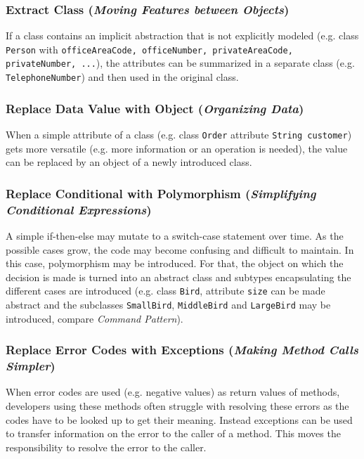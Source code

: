\subsubsection*{Extract Class (\textit{Moving Features between Objects})}
If a class contains an implicit abstraction that is not explicitly modeled (e.g. class \texttt{Person} with \texttt{officeAreaCode, officeNumber, privateAreaCode, privateNumber, ...}), the attributes can be summarized in a separate class (e.g. \texttt{TelephoneNumber}) and then used in the original class.

\subsubsection*{Replace Data Value with Object (\textit{Organizing Data})}
When a simple attribute of a class (e.g. class \texttt{Order} attribute \texttt{String customer}) gets more versatile (e.g. more information or an operation is needed), the value can be replaced by an object of a newly introduced class.

\subsubsection*{Replace Conditional with Polymorphism (\textit{Simplifying Conditional Expressions})}
A simple if-then-else may mutate to a switch-case statement over time.
As the possible cases grow, the code may become confusing and difficult to maintain.
In this case, polymorphism may be introduced.
For that, the object on which the decision is made is turned into an abstract class and subtypes encapsulating the different cases are introduced
(e.g. class \texttt{Bird}, attribute \texttt{size} can be made abstract and the subclasses \texttt{SmallBird}, \texttt{MiddleBird} and \texttt{LargeBird} may be introduced, compare \textit{Command Pattern}).

\subsubsection*{Replace Error Codes with Exceptions (\textit{Making Method Calls Simpler})}
When error codes are used (e.g. negative values) as return values of methods, developers using these methods often struggle with resolving these errors as the codes have to be looked up to get their meaning.
Instead exceptions can be used to transfer information on the error to the caller of a method.
This moves the responsibility to resolve the error to the caller.

\newpage
